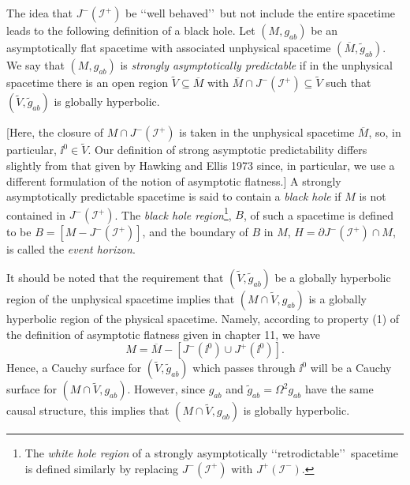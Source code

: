 The idea that \(J^-(\mathcal I^+)\) be \lq\lq well behaved\rq\rq\ but not include the
entire spacetime leads to the following definition of a black hole. Let \((M,g_{ab})\)
be an asymptotically flat spacetime with associated unphysical spacetime
\((\overline M,\widetilde g_{ab})\). We say that \((M,g_{ab})\) is \emph{strongly
asymptotically predictable} if in the unphysical spacetime there is an open region
\(\widetilde V\subseteq\overline M\) with
\(\overline M\cap J^-(\mathcal I^+)\subseteq\widetilde V\) such that
\((\widetilde V,\widetilde g_{ab})\) is globally hyperbolic.




[Here, the closure of \(M\cap J^-(\mathcal I^+)\) is taken in the unphysical
spacetime \(\overline M\), so, in particular, \(\ii^0\in\widetilde V\). Our definition
of strong asymptotic predictability differs slightly from that given by Hawking and
Ellis 1973 since, in particular, we use a different formulation of the notion of
asymptotic flatness.] A strongly asymptotically predictable spacetime is said to
contain a \emph{black hole} if \(M\) is not contained in \(J^-(\mathcal I^+)\). The
\emph{black hole region}\footnote{The \emph{white hole region} of a strongly
asymptotically \lq\lq retrodictable\rq\rq\ spacetime is defined similarly by replacing
\(J^-(\mathcal I^+)\) with \(J^+(\mathcal I^-)\).}, \(B\), of such a spacetime is
defined to be \(B=[M-J^-(\mathcal I^+)]\), and the boundary of \(B\) in \(M\),
\(H=\partial J^-(\mathcal I^+)\cap M\), is called the \emph{event horizon}.

It should be noted that the requirement that \((\widetilde V,\widetilde g_{ab})\) be
a globally hyperbolic region of the unphysical spacetime implies that
\((M\cap\widetilde V,g_{ab})\) is a globally hyperbolic region of the physical
spacetime. Namely, according to property (1) of the definition of asymptotic
flatness given in chapter 11, we have
\[
  M=\overline M-[J^-(\ii^0)\cup J^+(\ii^0)].
\]
Hence, a Cauchy surface for \((\widetilde V,\widetilde g_{ab})\) which passes
through \(\ii^0\) will be a Cauchy surface for \((M\cap\widetilde V,g_{ab})\).
However, since \(g_{ab}\) and \(\widetilde g_{ab}=\Omega^2g_{ab}\) have the same
causal structure, this implies that \((M\cap\widetilde V,g_{ab})\) is globally
hyperbolic.

